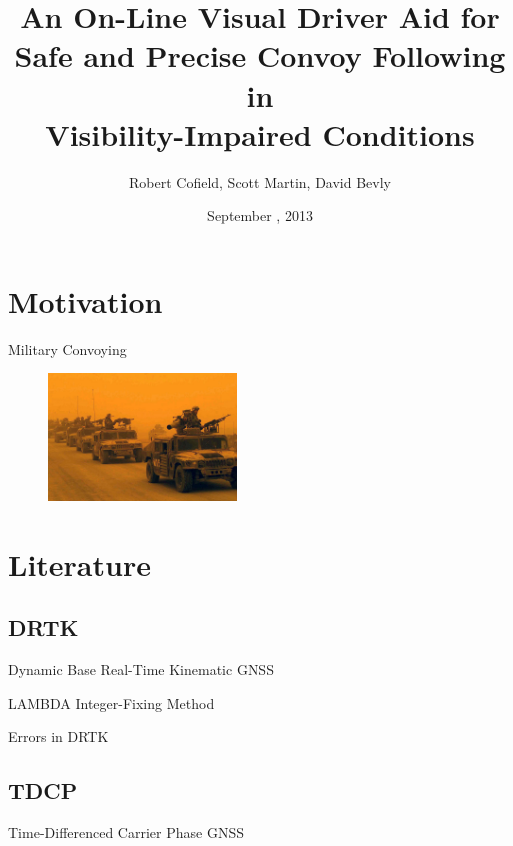\documentclass{beamer}
\title[DRTK Driver Assistance]{An On-Line Visual Driver Aid for\\ Safe and Precise Convoy Following in\\ Visibility-Impaired Conditions}
\author[]{Robert Cofield, Scott Martin, David Bevly}
\date{September , 2013}
\begin{document}
\frame{\titlepage}


\section{Motivation}

  \begin{frame}{Military Convoying}
    \begin{figure}
      \includegraphics[width=5cm]{../graphics/convoy_sandstorm_orange.jpg}
      \caption{\cite{convoy_dust_orange}}
    \end{figure}
  \end{frame} 


\section{Literature}

  \subsection{DRTK}

    \begin{frame}{Dynamic Base Real-Time Kinematic GNSS}
    \end{frame}

    \begin{frame}{LAMBDA Integer-Fixing Method}

    \end{frame}

    \begin{frame}{Errors in DRTK}
    \end{frame}

  \subsection{TDCP}

    \begin{frame}{Time-Differenced Carrier Phase GNSS}
    \end{frame}
\end{document}
